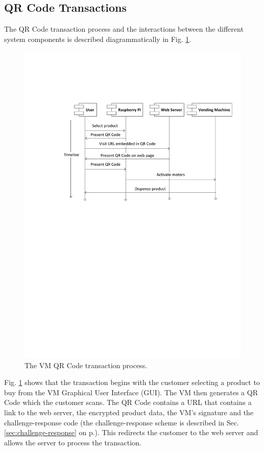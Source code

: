 \subsection{QR Code Transactions}

The QR Code transaction process and the interactions between the different
system components is described diagrammatically in Fig.
\ref{fig:vm_prog_interaction}.

\begin{figure}
 \centering 
 \includegraphics[clip=true, trim = 60 430 0 140, scale=0.7]{qrcode_processflow_user}
 \caption{The VM QR Code transaction process.}
 \label{fig:vm_prog_interaction}
\end{figure}

Fig. \ref{fig:vm_prog_interaction} shows that the transaction begins with
the customer selecting a product to buy from the VM Graphical User
Interface (GUI). The VM then generates a QR Code which the customer scans. The QR Code
contains a URL that contains a link to the web server, the encrypted product
data, the VM's signature and the challenge-response code (the challenge-response scheme is
described in Sec. \ref{sec:challenge-response} on p.\pageref{sec:challenge-response}).
This redirects the customer to the web server and allows the server to process the
transaction.

